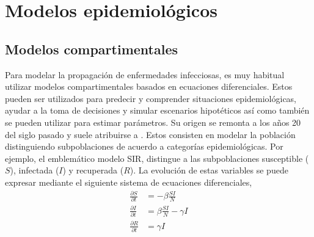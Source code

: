 \chapter{Modelos epidemiológicos} \label{chp:epi_models}

\section{Modelos compartimentales}

Para modelar la propagación de enfermedades infecciosas, es muy habitual utilizar modelos compartimentales basados en ecuaciones diferenciales. Estos pueden ser utilizados para predecir y comprender situaciones epidemiológicas, ayudar a la toma de decisiones y simular escenarios hipotéticos así como también se pueden utilizar para estimar parámetros. Su origen se remonta a los años 20 del siglo pasado y suele atribuirse a \cite{Kermack1927}. Estos consisten en modelar la población distinguiendo subpoblaciones de acuerdo a categorías epidemiológicas. Por ejemplo, el emblemático modelo SIR, distingue a las subpoblaciones susceptible ($S$), infectada ($I$) y recuperada ($R$). La evolución de estas variables se puede expresar mediante el siguiente sistema de ecuaciones diferenciales,
\begin{align} \label{eq:sir}
    \frac{\partial S}{\partial t} &= -\beta \frac{SI}{N}\\
    \frac{\partial I}{\partial t} &= \beta \frac{SI}{N} - \gamma I \\
    \frac{\partial R}{\partial t} &= \gamma I
\end{align}
